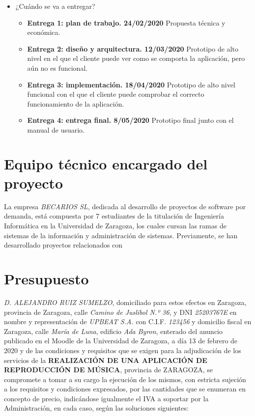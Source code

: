 \documentclass{article}
\begin{document}
\begin{itemize}
	\item ¿Cuándo se va a entregar?
	\begin{itemize}
		\item \textbf{Entrega 1: plan de trabajo. 24/02/2020}
		Propuesta técnica y económica.
		\item \textbf{Entrega 2: diseño y arquitectura. 12/03/2020}
		Prototipo de alto nivel en el que el cliente puede ver como se comporta la aplicación, pero aún no es funcional.
		\item \textbf{Entrega 3: implementación. 18/04/2020}
		Prototipo de alto nivel funcional con el que el cliente puede comprobar el correcto funcionamiento de la aplicación.
		\item \textbf{Entrega 4: entrega final. 8/05/2020}
		Prototipo final junto con el manual de usuario.
	\end{itemize}
\end{itemize}

\newpage

\section{Equipo técnico encargado del proyecto}
La empresa \textit{BECARIOS SL}, dedicada al desarrollo de proyectos de software por demanda, está compuesta por 7 estudiantes de la titulación de Ingeniería Informática en la Universidad de Zaragoza, los cuales cursan las ramas de sistemas de la información y administración de sistemas.
\hfill \break
Previamente, se han desarrollado proyectos relacionados con 

\newpage

\section{Presupuesto}
\textit{D. ALEJANDRO RUIZ SUMELZO}, domiciliado para estos efectos en Zaragoza, provincia de Zaragoza, calle \textit{Camino de Juslibol N.º 36}, y DNI \textit{25203767E} en nombre y representación de \textit{UPBEAT S.A.} con C.I.F. \textit{123456} y domicilio fiscal en Zaragoza, calle \textit{María de Luna}, edificio \textit{Ada Byron}, enterado del anuncio publicado en el Moodle de la Universidad de Zaragoza, a día 13 de febrero de 2020 y de las condiciones y requisitos que se exigen para la adjudicación de los servicios de la \textbf{REALIZACIÓN DE UNA APLICACIÓN DE REPRODUCCIÓN DE MÚSICA}, provincia de ZARAGOZA, se compromete a tomar a su cargo la ejecución de los mismos, con estricta sujeción a los requisitos y condiciones expresados, por las cantidades que se enumeran en concepto de precio, indicándose igualmente el IVA a soportar por la Administración, en cada caso, según las soluciones siguientes:
\end{document}
